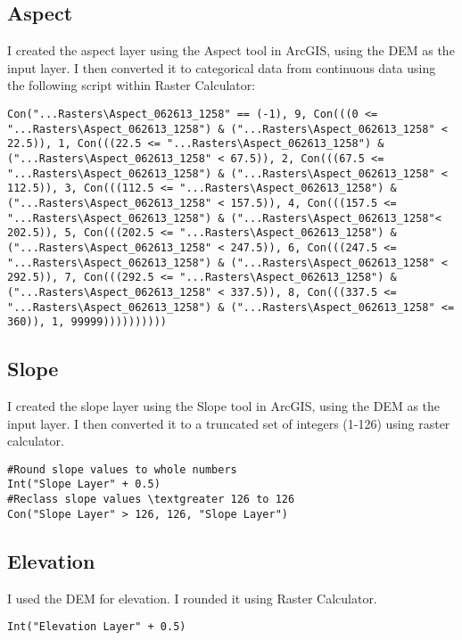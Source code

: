 \subsection{Aspect}
I created the aspect layer using the Aspect tool in ArcGIS, using the DEM as the input layer. I then converted it to categorical data from continuous data using the following script within Raster Calculator:
\lstset{language=SQL}
\begin{lstlisting}
Con("...Rasters\Aspect_062613_1258" == (-1), 9, Con(((0 <= "...Rasters\Aspect_062613_1258") & ("...Rasters\Aspect_062613_1258" < 22.5)), 1, Con(((22.5 <= "...Rasters\Aspect_062613_1258") & ("...Rasters\Aspect_062613_1258" < 67.5)), 2, Con(((67.5 <= "...Rasters\Aspect_062613_1258") & ("...Rasters\Aspect_062613_1258" < 112.5)), 3, Con(((112.5 <= "...Rasters\Aspect_062613_1258") & ("...Rasters\Aspect_062613_1258" < 157.5)), 4, Con(((157.5 <= "...Rasters\Aspect_062613_1258") & ("...Rasters\Aspect_062613_1258"< 202.5)), 5, Con(((202.5 <= "...Rasters\Aspect_062613_1258") & ("...Rasters\Aspect_062613_1258" < 247.5)), 6, Con(((247.5 <= "...Rasters\Aspect_062613_1258") & ("...Rasters\Aspect_062613_1258" < 292.5)), 7, Con(((292.5 <= "...Rasters\Aspect_062613_1258") & ("...Rasters\Aspect_062613_1258" < 337.5)), 8, Con(((337.5 <= "...Rasters\Aspect_062613_1258") & ("...Rasters\Aspect_062613_1258" <= 360)), 1, 99999))))))))))
\end{lstlisting}
\lstset{language=Python}

\subsection{Slope}
I created the slope layer using the Slope tool in ArcGIS, using the DEM as the input layer. I then converted it to a truncated set of integers (1-126) using raster calculator.
\lstset{language=SQL}
\begin{lstlisting}
#Round slope values to whole numbers
Int("Slope Layer" + 0.5)
#Reclass slope values \textgreater 126 to 126
Con("Slope Layer" > 126, 126, "Slope Layer")
\end{lstlisting}
\lstset{language=Python}

\subsection{Elevation}
I used the DEM for elevation. I rounded it using Raster Calculator.
\lstset{language=SQL}
\begin{lstlisting}
Int("Elevation Layer" + 0.5)
\end{lstlisting}
\lstset{language=Python}

